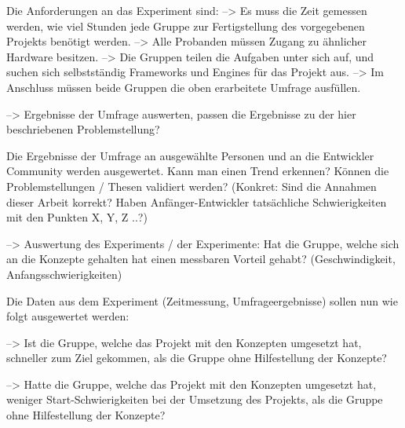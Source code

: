 Die Anforderungen an das Experiment sind:
--> Es muss die Zeit gemessen werden, wie viel Stunden jede Gruppe zur Fertigstellung des vorgegebenen Projekts benötigt werden.
--> Alle Probanden müssen Zugang zu ähnlicher Hardware besitzen.
--> Die Gruppen teilen die Aufgaben unter sich auf, und suchen sich selbstständig Frameworks und Engines für das Projekt aus.
--> Im Anschluss müssen beide Gruppen die oben erarbeitete Umfrage ausfüllen.


	--> Ergebnisse der Umfrage auswerten, passen die Ergebnisse zu der hier beschriebenen Problemstellung?

Die Ergebnisse der Umfrage an ausgewählte Personen und an die Entwickler Community werden ausgewertet. Kann man einen Trend erkennen? Können die Problemstellungen / Thesen validiert werden? 
(Konkret: Sind die Annahmen dieser Arbeit korrekt? Haben Anfänger-Entwickler tatsächliche Schwierigkeiten mit den Punkten X, Y, Z ..?)

	--> Auswertung des Experiments / der Experimente: Hat die Gruppe, welche sich an die Konzepte gehalten hat einen messbaren Vorteil gehabt? (Geschwindigkeit, Anfangsschwierigkeiten)
	
Die Daten aus dem Experiment (Zeitmessung, Umfrageergebnisse) sollen nun wie folgt ausgewertet werden:

--> Ist die Gruppe, welche das Projekt mit den Konzepten umgesetzt hat, schneller zum Ziel gekommen, als die Gruppe ohne Hilfestellung der Konzepte?

--> Hatte die Gruppe, welche das Projekt mit den Konzepten umgesetzt hat, weniger Start-Schwierigkeiten bei der Umsetzung des Projekts, als die Gruppe ohne Hilfestellung der Konzepte?










